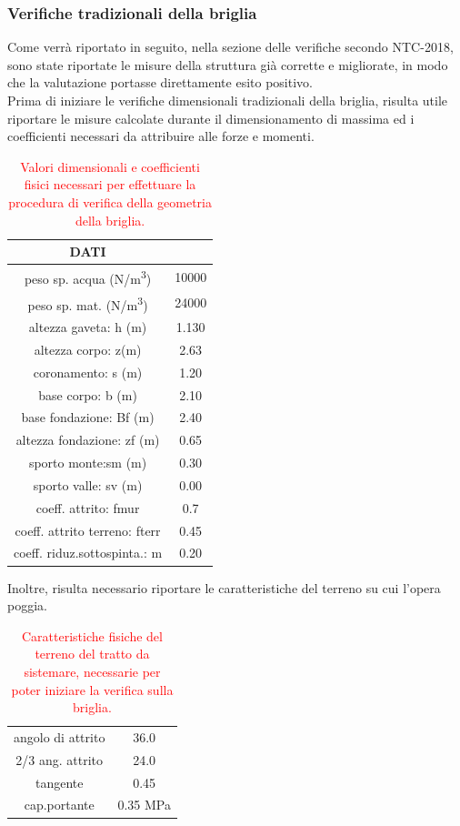 \subsubsection{Verifiche tradizionali della briglia}
Come verrà riportato in seguito, nella sezione delle verifiche secondo NTC-2018, sono state riportate le misure della struttura già corrette e migliorate, in modo che la valutazione portasse direttamente esito positivo.\\
Prima di iniziare le verifiche dimensionali tradizionali della briglia, risulta utile riportare le misure calcolate durante il dimensionamento di massima ed i coefficienti necessari da attribuire alle forze e momenti.
\begin{table}[H] \centering
    \caption{\textcolor{red}{Valori dimensionali e coefficienti fisici necessari per effettuare la procedura di verifica della geometria della briglia.}}
    \begin{tabular}{cc}
    \toprule
    DATI                          &       \\
    \midrule
    peso sp. acqua (\unit{N/m^3})         & 10000 \\
    peso sp. mat. (\unit{N/m^3})          & 24000 \\
    altezza gaveta: h (m)         & 1.130 \\
    altezza corpo: z(m)           & 2.63  \\
    coronamento: s (m)            & 1.20  \\
    base corpo: b (m)              & 2.10  \\
    base fondazione: Bf (m)       & 2.40  \\
    altezza fondazione: zf (m)    & 0.65  \\
    sporto monte:sm (m)            & 0.30  \\
    sporto valle: sv (m)           & 0.00  \\
    coeff. attrito: fmur           & 0.7   \\
    coeff. attrito terreno: fterr & 0.45  \\
    coeff. riduz.sottospinta.: m  & 0.20  \\
    \bottomrule
    \end{tabular}
\end{table}
Inoltre, risulta necessario riportare le caratteristiche del terreno su cui l'opera poggia.
\begin{table}[H] \centering
    \caption{\textcolor{red}{Caratteristiche fisiche del terreno del tratto da sistemare, necessarie per poter iniziare la verifica sulla briglia.}}
    \begin{tabular}{cc}
    \toprule
    angolo di attrito & 36.0      \\
    2/3 ang. attrito  & 24.0      \\
    tangente          & 0.45      \\
    cap.portante      & 0.35 MPa \\
    \bottomrule
    \end{tabular}
    \end{table}

